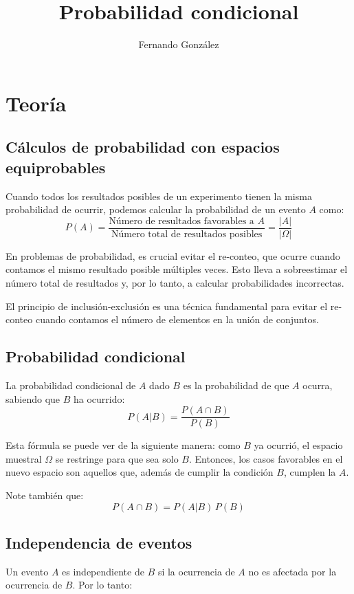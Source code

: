 \documentclass[letterpaper, 12pt]{article}
\title{Probabilidad condicional}
\date{}
\author{Fernando González}
\begin{document}
	
	\maketitle
	
	\section{Teoría}
	
	\subsection{Cálculos de probabilidad con espacios equiprobables}
	Cuando todos los resultados posibles de un experimento tienen la misma probabilidad de ocurrir, podemos calcular la probabilidad de un evento $A$ como:
	$$P(A) = \frac{\text{Número de resultados favorables a } A}{\text{Número total de resultados posibles}} = \frac{|A|}{|\Omega|}$$
	
	En problemas de probabilidad, es crucial evitar el re-conteo, que ocurre cuando contamos el mismo resultado posible múltiples veces. Esto lleva a sobreestimar el número total de resultados y, por lo tanto, a calcular probabilidades incorrectas.
	
	El principio de inclusión-exclusión es una técnica fundamental para evitar el re-conteo cuando contamos el número de elementos en la unión de conjuntos.
	
	\subsection{Probabilidad condicional}
	La probabilidad condicional de $A$ dado $B$ es la probabilidad de que $A$ ocurra, sabiendo que $B$ ha ocurrido:
	$$P(A | B) = \frac{P(A \cap B)}{P(B)}$$
	
	Esta fórmula se puede ver de la siguiente manera: como $B$ ya ocurrió, el espacio muestral $\Omega$ se restringe para que sea solo $B$. Entonces, los casos favorables en el nuevo espacio son aquellos que, además de cumplir la condición $B$, cumplen la $A$.
	
	Note también que:
	$$P(A \cap B) = P(A | B) \, P(B)$$
	
	\subsection{Independencia de eventos}
	Un evento $A$ es independiente de $B$ si la ocurrencia de $A$ no es afectada por la ocurrencia de $B$. Por lo tanto:
	
\end{document}
